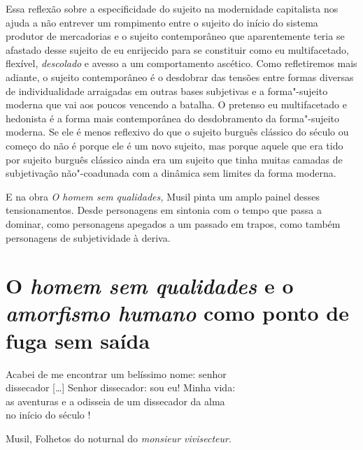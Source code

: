 Essa reflexão sobre a especificidade do sujeito na modernidade
capitalista nos ajuda a não entrever um rompimento entre o sujeito do
início do sistema produtor de mercadorias e o sujeito contemporâneo que
aparentemente teria se afastado desse sujeito de eu enrijecido para se
constituir como eu multifacetado, flexível, \emph{descolado} e avesso a
um comportamento ascético. Como refletiremos mais adiante, o sujeito
contemporâneo é o desdobrar das tensões entre formas diversas de
individualidade arraigadas em outras bases subjetivas e a forma"-sujeito
moderna que vai aos poucos vencendo a batalha. O pretenso eu
multifacetado e hedonista é a forma mais contemporânea do desdobramento
da forma"-sujeito moderna. Se ele é menos reflexivo do que o sujeito
burguês clássico do século  ou começo do  não é porque ele é um
novo sujeito, mas porque aquele que era tido por sujeito burguês
clássico ainda era um sujeito que tinha muitas camadas de subjetivação
não"-coadunada com a dinâmica sem limites da forma moderna.

E na obra \emph{O homem sem qualidades,} Musil pinta um amplo painel
desses tensionamentos. Desde personagens em sintonia com o tempo que
passa a dominar, como personagens apegados a um passado em trapos, como
também personagens de subjetividade à deriva.

\section{O \emph{homem sem qualidades} e o \emph{amorfismo humano} como ponto de fuga sem saída}



\epigraph{Acabei de me encontrar um belíssimo nome: senhor\\
dissecador [\ldots{}] Senhor dissecador: sou eu! Minha vida:\\
as aventuras e a odisseia de um dissecador da alma\\
no início do século !}{Musil, Folhetos do noturnal do \emph{monsieur vivisecteur}.}


